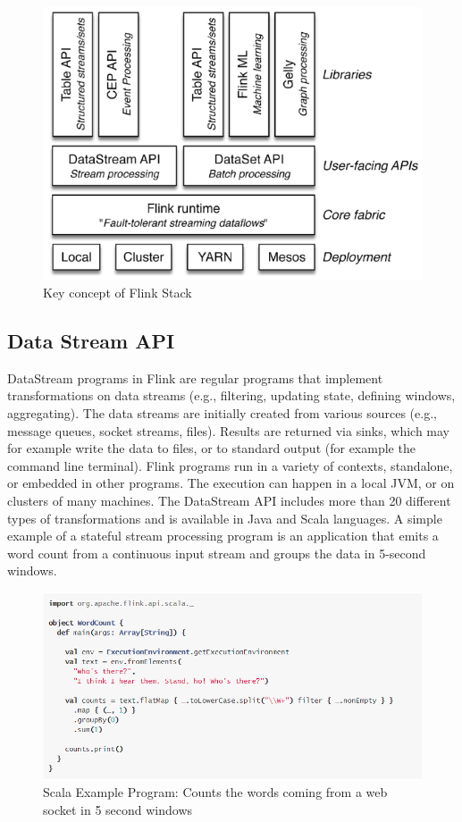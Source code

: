 \documentclass[9pt,twocolumn,twoside]{styles/osajnl}
\begin{document}
\begin{figure}[H]
 \centering
\includegraphics[scale=0.7]{images/image6}
\caption{Key concept of Flink Stack ~\cite{www-flink}}
\end{figure}

\subsection{Data Stream API}

DataStream programs in Flink are regular programs that implement transformations on data streams (e.g., filtering, updating state, defining windows, aggregating). The data streams are initially created from various sources (e.g., message queues, socket streams, files). Results are returned via sinks, which may for example write the data to files, or to standard output (for example the command line terminal). Flink programs run in a variety of contexts, standalone, or embedded in other programs. The execution can happen in a local JVM, or on clusters of many machines. The DataStream API includes more than 20 different types of transformations and is available in Java and Scala languages. A simple example of a stateful stream processing program is an application that emits a word count from a continuous input stream and groups the data in 5-second windows.

\begin{figure}[H]
 \centering
\includegraphics[scale=0.5]{images/image7}
\caption{Scala Example Program: Counts the words coming from a web socket in 5 second windows ~\cite{www-flink}}
\end{figure}
\end{document}
